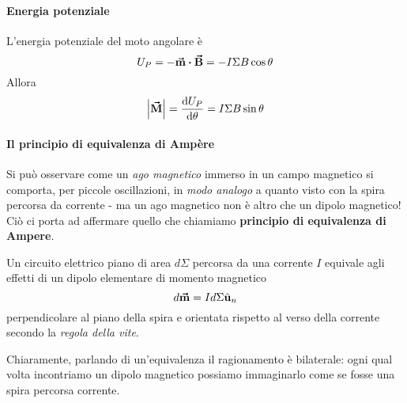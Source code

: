 \paragraph{Energia potenziale}
L'energia potenziale del moto angolare è
\begin{equation}
	U_P=-\vba{m}\vdot\vba{B}=-I\Sigma B\cos\theta
\end{equation}
Allora
\begin{equation}
	\abs{\vb*{\va{M}}}=\dv{U_P}{\theta}=I\Sigma B\sin\theta
\end{equation}\label{EnergiaPotenzialeCasoGeneralemanontroppo}
\paragraph{Il principio di equivalenza di Ampère}\label{principio di equivalenza di ampere}
Si può osservare come un \textit{ago magnetico} immerso in un campo magnetico si comporta, per piccole oscillazioni, in \textit{modo analogo} a quanto visto con la spira percorsa da corrente - ma un ago magnetico non è altro che un dipolo magnetico! Ciò ci porta ad affermare quello che chiamiamo \textbf{principio di equivalenza di Ampere}.
\begin{principle}
	Un circuito elettrico piano di area $d\Sigma$ percorsa da una corrente $I$ equivale agli effetti di un dipolo elementare di momento magnetico
	\begin{equation}
		d\vb*{\va{m}}=Id\Sigma \hat{\mathbf{u}}_n
	\end{equation}
	perpendicolare al piano della spira e orientata rispetto al verso della corrente secondo la \textit{regola della vite}.
\end{principle}%
Chiaramente, parlando di un'equivalenza il ragionamento è bilaterale: ogni qual volta incontriamo un dipolo magnetico possiamo immaginarlo come se fosse una spira percorsa corrente.
